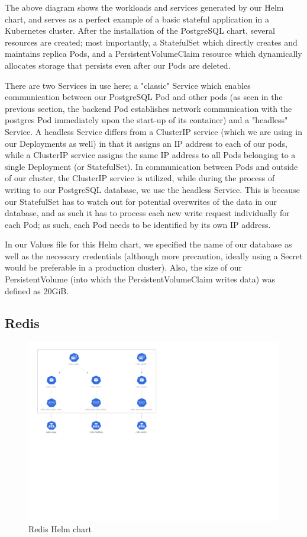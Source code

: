 \documentclass[thesis=B,english]{FITthesis}[2019/12/23]
\begin{document}
The above diagram shows the workloads and services generated by our Helm chart, and serves as a perfect example of a basic stateful application in a Kubernetes cluster. After the installation of the PostgreSQL chart, several resources are created; most importantly, a StatefulSet which directly creates and maintains replica Pods, and a PersistentVolumeClaim resource which dynamically allocates storage that persists even after our Pods are deleted.

There are two Services in use here; a "classic" Service which enables communication between our PostgreSQL Pod and other pods (as seen in the previous section, the backend Pod establishes network communication with the postgres Pod immediately upon the start-up of its container) and a "headless" Service. A headless Service differs from a ClusterIP service (which we are using in our Deployments as well) in that it assigns an IP address to each of our pods, while a ClusterIP service assigns the same IP address to all Pods belonging to a single Deployment (or StatefulSet). \cite{kube-action} In communication between Pods and outside of our cluster, the ClusterIP service is utilized, while during the process of writing to our PostgreSQL database, we use the headless Service. This is because our StatefulSet has to watch out for potential overwrites of the data in our database, and as such it has to process each new write request individually for each Pod; as such, each Pod needs to be identified by its own IP address.

In our Values file for this Helm chart, we specified the name of our database as well as the necessary credentials (although more precaution, ideally using a Secret would be preferable in a production cluster). Also, the size of our PersistentVolume (into which the PersistentVolumeClaim writes data) was defined as 20GiB.

\subsection{Redis}

\begin{figure}[H]
\centering
\caption{Redis Helm chart}
\hspace*{-4.4cm}
\includegraphics[scale=0.5]{redis-diagram}
\end{figure}
\end{document}
